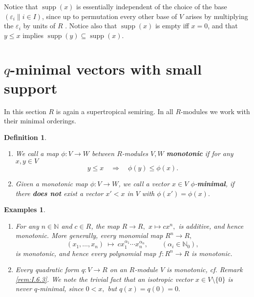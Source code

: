 \documentclass [12pt,a4paper,reqno]{amsart}
\newtheorem{examples}[thm]{Examples}
\newtheorem{defn}[thm]{Definition}
\begin{document}
Notice that   $ {\operatorname{supp}}(x)$ is essentially independent of the choice of the base
$({\varepsilon}_i  \|i\in I)$, since up to permutation every other base of $V$ arises by multiplying the ${\varepsilon}_i$ by units of $R$ {\cite[Theorem~{{0.9}}]{QF1}}. Notice also that ${\operatorname{supp}}(x)$ is empty iff $x= 0$, and that $y \leq x$ implies ${\operatorname{supp}}(y) \subseteq {\operatorname{supp}}(x)$.

\section{$q$-minimal vectors with small support}\label{sec:II.9}

In this section $R$ is again a  supertropical semiring. In all $R$-modules we work with their minimal orderings.

\begin{defn}\label{defn:II.9.1} $ $
\begin{enumerate}\item[a)] We call a map ${\phi}  :V\to W$ between $R$-modules $V,W $ {\textbf{{monotonic}}}
if for any $x,y\in V$
$$y\le x {\quad {\Rightarrow} \quad } {\phi}  (y)\le{\phi}  (x).$$ {\vskip 1.5mm \noindent}
\item[b)] Given a monotonic map ${\phi}  : V\to W$, we call a vector $x\in V$ ${\phi}  $-{\textbf{{minimal}}},
 if there {\textbf{{does
not}}} exist a vector $x'<x$ in $V$ with ${\phi}  (x')={\phi}  (x).$
\end{enumerate}\end{defn}

\begin{examples}\label{examps:II.9.2} $ $ \begin{enumerate}
\item[i)] For any $n\in{\mathbb N}$ and $c\in R$, the map $R\to R,$ $x\mapsto cx^n,$ is additive, and hence monotonic. More generally,
every monomial map $R^n\to R,$
$$(x_1,\dots, x_n) {\ {\mapsto} \ } cx_1^{{\alpha} _1}\cdots x_n^{{\alpha} _n}, \qquad ({\alpha} _i\in{\mathbb N}_0),$$
is monotonic, and hence every polynomial map $f: R^n\to R$ is monotonic.
{\vskip 1.5mm \noindent}

\item[ii)] Every quadratic form $q: V\to R$ on an $R$-module $V$ is monotonic, cf.
Remark \ref{rem:I.6.3}. We note the trivial fact
that an isotropic vector $x\in V{\setminus}\{0\}$ is never $q$-minimal, since $0<x,$ but $q(x)=q(0)=0.$

\end{enumerate}
\end{examples}
\end{document}
